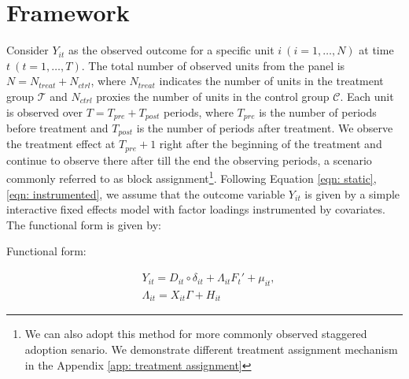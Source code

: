 \documentclass[12pt]{article}
\begin{document}
\section{Framework} 
\label{sec: framework}

Consider $Y_{it}$ as the observed outcome for a specific unit $i \ (i = 1, \dots, N)$ at time $t \ (t = 1, \dots, T)$. The total number of observed units from the panel is $N = N_{treat} + N_{ctrl}$, where $N_{treat}$ indicates the number of units in the treatment group $\mathcal{T}$ and $N_{ctrl}$ proxies the number of units in the control group $\mathcal{C}$. Each unit is observed over $T = T_{pre} + T_{post}$ periods, where $T_{pre}$ is the number of periods before treatment and $T_{post}$ is the number of periods after treatment. We observe the treatment effect at $T_{pre} + 1$ right after the beginning of the treatment and continue to observe there after till the end the observing periods, a scenario commonly referred to as block assignment\footnote{We can also adopt this method for more commonly observed staggered adoption senario. We demonstrate different treatment assignment mechanism in the Appendix \ref{app: treatment assignment}}. Following Equation \ref{eqn: static}, \ref{eqn: instrumented}, we assume that the outcome variable $Y_{it}$ is given by a simple interactive fixed effects model with factor loadings instrumented by covariates. The functional form is given by:

\begin{assumption}
Functional form:
\label{ass: function}
\end{assumption}

\begin{equation}
\begin{aligned}
& Y_{it} = D_{it} \circ \delta_{it} + \Lambda_{it}F_{t}' + \mu_{it}, \\
& \Lambda_{it} = X_{it}\Gamma + H_{it}
\end{aligned}
\label{eqn: functional form}
\end{equation}
\end{document}
